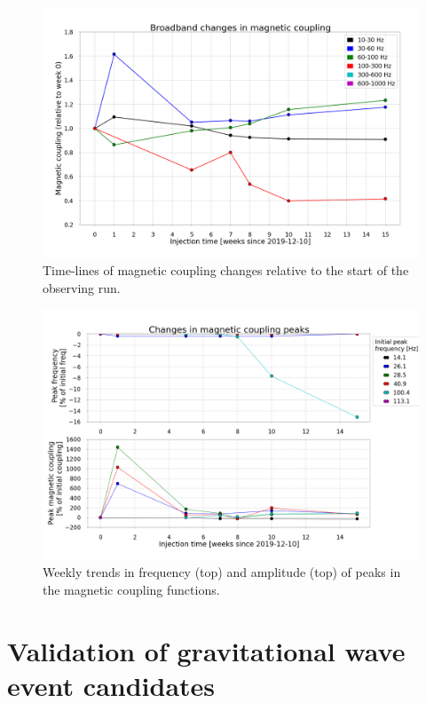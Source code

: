 \begin{figure}[h]
	\centering
	\includegraphics[width=\textwidth]{figures/noise-studies/mag-weekly-bands.png}
	\caption{Time-lines of magnetic coupling changes relative to the start of the observing run.}
	\label{fig:mag-weekly-bands}
\end{figure}

\begin{figure}[h]
	\centering
	\includegraphics[width=\textwidth]{figures/noise-studies/mag-weekly-peaks.png}
	\caption{Weekly trends in frequency (top) and amplitude (top) of peaks in the magnetic coupling functions.}
	\label{fig:mag-weekly-peaks}
\end{figure}

\section{Validation of gravitational wave event candidates}\label{sec:vetting}

